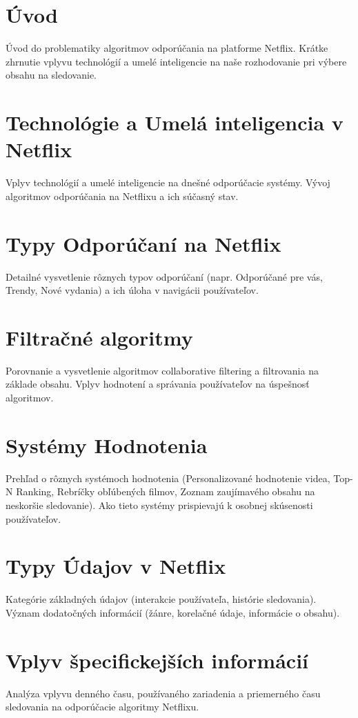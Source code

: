 \documentclass[10pt,twoside,slovak,a4paper]{article}
\begin{document}
\section{Úvod}
Úvod do problematiky algoritmov odporúčania na platforme Netflix.
Krátke zhrnutie vplyvu technológií a umelé inteligencie na naše rozhodovanie pri výbere obsahu na sledovanie.

\section{Technológie a Umelá inteligencia v Netflix}
Vplyv technológií a umelé inteligencie na dnešné odporúčacie systémy.
Vývoj algoritmov odporúčania na Netflixu a ich súčasný stav.

\section{Typy Odporúčaní na Netflix}
Detailné vysvetlenie rôznych typov odporúčaní (napr. Odporúčané pre vás, Trendy, Nové vydania) a ich úloha v navigácii používateľov.

\section{Filtračné algoritmy}
Porovnanie a vysvetlenie algoritmov collaborative filtering a filtrovania na základe obsahu.
Vplyv hodnotení a správania používateľov na úspešnosť algoritmov.

\section{Systémy Hodnotenia}
Prehľad o rôznych systémoch hodnotenia (Personalizované hodnotenie videa, Top-N Ranking, Rebríčky obľúbených filmov, Zoznam zaujímavého obsahu na neskoršie sledovanie).
Ako tieto systémy prispievajú k osobnej skúsenosti používateľov.

\section{Typy Údajov v Netflix}
Kategórie základných údajov (interakcie používateľa, histórie sledovania).
Význam dodatočných informácií (žánre, korelačné údaje, informácie o obsahu).

\section{Vplyv špecifickejších informácií}
Analýza vplyvu denného času, používaného zariadenia a priemerného času sledovania na odporúčacie algoritmy Netflixu.
\end{document}
